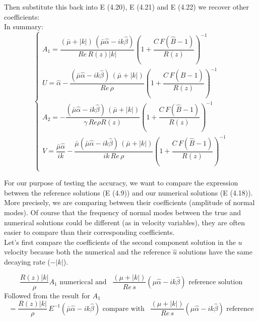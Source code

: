 Then substitute this back into E (4.20), E (4.21) and E (4.22) we recover other coefficients:\\
In summary:
\begin{equation}
\begin{cases}
A_1 = \dfrac{(\bar{\mu} + |k|)\,(\bar{\mu} \hat{\alpha} - ik \hat{\beta})}{Re \, R(z) |k|}(1 + \dfrac{C \, F(\hat{B} - 1)}{R(z)})^{-1}\\
U = \hat{\alpha} - \dfrac{(\bar{\mu} \hat{\alpha} - ik \hat{\beta}) \, (\bar{\mu} + |k|)}{Re \, \rho} (1 + \dfrac{C\,F(\hat{B} - 1)}{R(z)})^{-1}\\
A_2 = - \dfrac{(\bar{\mu} \hat{\alpha} - ik \hat{\beta}) \, (\bar{\mu} + |k|)}{\gamma \, Re \rho R(z)}(1 + \dfrac{C\,F(\hat{B} - 1)}{R(z)})^{-1}\\
V = \dfrac{\bar{\mu} \hat{\alpha}}{i k} - \dfrac{\bar{\mu}(\bar{\mu} \hat{\alpha} - ik \hat{\beta}) \, (\bar{\mu} + |k|)}{ik \, Re \, \rho} (1 + \dfrac{C\,F(\hat{B} - 1)}{R(z)})^{-1}\\
\end{cases}
\end{equation}

For our purpose of testing the accuracy, we want to compare the expression between the reference solutions (E (4.9)) and our numerical solutions (E (4.18)). More precisely, we are comparing between their coefficients (amplitude of normal modes). Of course that the frequency of normal modes between the true and numerical solutions could be different (as in velocity variables), they are often easier to compare than their corresponding coefficients. \\

Let's first compare the coefficients of the second component solution in the $u$ velocity because both the numerical and the reference $\hat{u}$ solutions have the same decaying rate ($- |k|$).

\begin{equation*}
\dfrac{R(z) |k|}{\rho} A_1 \text{ numericcal and } \, \, \, \dfrac{(\mu + |k|)}{Re \, s} (\mu \hat{\alpha} - ik \hat{\beta}) \text{ reference solution}
\end{equation*}
Followed from the result for $A_1$
\begin{equation*}
= \dfrac{R(z) |k|}{\rho} \, E^{-1} (\bar{\mu} \hat{\alpha} - ik \hat{\beta})\text{ compare with } \, \, \, \dfrac{(\mu + |k|)}{Re \, s} (\mu \hat{\alpha} - ik \hat{\beta})\text{ reference}
\end{equation*}

